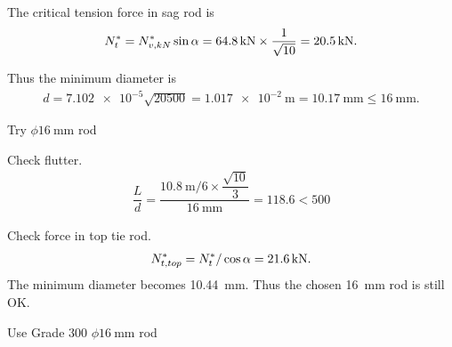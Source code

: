 \begin{solution}
The critical tension force in sag rod is
\begin{gather*}
N^*_t=N^*_{v,kN}\sin\alpha=\SI{64.8}{\kilo\newton}\times\dfrac{1}{\sqrt{10}}=\SI{20.5}{\kilo\newton}.
\end{gather*}
\begin{figure}[H]
\centering\footnotesize
{}
\end{figure}

Thus the minimum diameter is
\begin{gather*}
d=\num{7.102e-5}\sqrt{20500}=\SI{1.017e-2}{\meter}=\SI{10.17}{\mm}\le\SI{16}{\mm}.
\end{gather*}
\begin{flushright}
Try $\phi\SI{16}{\mm}$ rod
\end{flushright}

Check flutter.
\begin{gather}
\dfrac{L}{d}=\dfrac{\SI{10.8}{\meter}/6\times\dfrac{\sqrt{10}}{3}}{\SI{16}{\mm}}=118.6<500
\end{gather}

Check force in top tie rod.
\begin{gather*}
N^*_{t,top}=N^*_t/\cos\alpha=\SI{21.6}{\kilo\newton}.
\end{gather*}
The minimum diameter becomes \SI{10.44}{\mm}.
Thus the chosen \SI{16}{\mm} rod is still OK.
\begin{figure}[H]
\centering\footnotesize
{}
\end{figure}
\begin{flushright}
Use Grade 300 $\phi\SI{16}{\mm}$ rod
\end{flushright}
\end{solution}